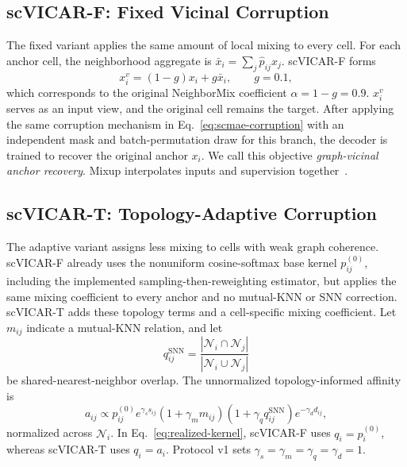 \subsection{scVICAR-F: Fixed Vicinal Corruption}

The fixed variant applies the same amount of local mixing to every cell. For
each anchor cell, the neighborhood aggregate is
$\bar x_i=\sum_j\widehat p_{ij}x_j$.  scVICAR-F forms
\begin{equation}
 x_i^v=(1-g)x_i+g\bar x_i,
 \qquad g=0.1,
 \label{eq:fixed-view}
\end{equation}
which corresponds to the original NeighborMix coefficient $\alpha=1-g=0.9$.
$x_i^v$ serves as an input view, and the original cell remains the target.
After applying the same corruption mechanism in Eq.~\eqref{eq:scmae-corruption}
with an independent mask and batch-permutation draw for this branch, the decoder
is trained to recover the original anchor $x_i$. We call this objective
\emph{graph-vicinal anchor recovery}. Mixup interpolates inputs and supervision
together~\cite{zhang2018mixup}.

\subsection{scVICAR-T: Topology-Adaptive Corruption}

The adaptive variant assigns less mixing to cells with weak graph coherence.
scVICAR-F already uses the nonuniform cosine-softmax base kernel
$p_{ij}^{(0)}$, including the implemented sampling-then-reweighting estimator,
but applies the same mixing coefficient to every anchor and no mutual-KNN or
SNN correction. scVICAR-T adds these topology terms and a cell-specific
mixing coefficient. Let $m_{ij}$ indicate a mutual-KNN relation, and let
\begin{equation}
 q_{ij}^{\mathrm{SNN}}=
 \frac{|\mathcal N_i\cap\mathcal N_j|}
 {|\mathcal N_i\cup\mathcal N_j|}
\end{equation}
be shared-nearest-neighbor overlap.  The unnormalized topology-informed
affinity is
\begin{equation}
 a_{ij}\propto p_{ij}^{(0)}
 e^{\gamma_s s_{ij}}
 (1+\gamma_m m_{ij})
 (1+\gamma_q q_{ij}^{\mathrm{SNN}})
 e^{-\gamma_d d_{ij}},
 \label{eq:topology-affinity}
\end{equation}
normalized across $\mathcal N_i$.  In Eq.~\eqref{eq:realized-kernel}, scVICAR-F
uses $q_i=p_i^{(0)}$, whereas scVICAR-T uses $q_i=a_i$.
Protocol v1 sets $\gamma_s=\gamma_m=\gamma_q=\gamma_d=1$.

